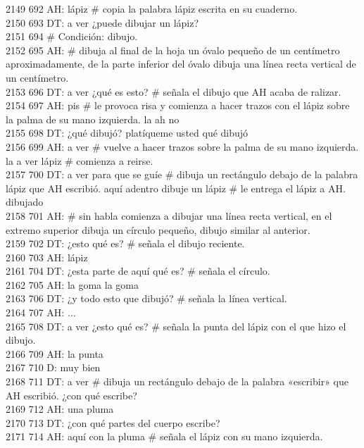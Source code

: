 2149 692 AH: lápiz # copia la palabra lápiz escrita en su cuaderno.\\
2150 693 DT: a ver ¿puede dibujar un lápiz?\\
2151 694 # Condición: dibujo.\\
2152 695 AH: # dibuja al final de la hoja un óvalo pequeño de un centímetro aproximadamente, de la parte inferior del óvalo dibuja una línea recta vertical de un centímetro.\\
2153 696 DT: a ver ¿qué es esto? # señala el dibujo que AH acaba de ralizar.\\
2154 697 AH: pis # le provoca risa y comienza a hacer trazos con el lápiz sobre la palma de su mano izquierda. la ah no\\
2155 698 DT: ¿qué dibujó? platíqueme usted qué dibujó\\
2156 699 AH: a ver # vuelve a hacer trazos sobre la palma de su mano izquierda. la a ver lápiz # comienza a reirse. \\
2157 700 DT: a ver para que se guíe # dibuja un rectángulo debajo de la palabra lápiz que AH escribió. aquí adentro dibuje un lápiz # le entrega el lápiz a AH. dibujado\\
2158 701 AH: # sin habla comienza a dibujar una línea recta vertical, en el extremo superior dibuja un círculo pequeño, dibujo similar al anterior.\\
2159 702 DT: ¿esto qué es? # señala el dibujo reciente.\\
2160 703 AH: lápiz\\
2161 704 DT: ¿esta parte de aquí qué es? # señala el círculo.\\
2162 705 AH: la goma la goma\\
2163 706 DT: ¿y todo esto que dibujó? # señala la línea vertical.\\
2164 707 AH: ...\\
2165 708 DT: a ver ¿esto qué es? # señala la punta del lápiz con el que hizo el dibujo.\\
2166 709 AH: la punta\\
2167 710 D: muy bien\\
2168 711 DT: a ver # dibuja un rectángulo debajo de la palabra «escribir» que AH escribió. ¿con qué escribe?\\
2169 712 AH: una pluma\\
2170 713 DT: ¿con qué partes del cuerpo escribe?\\
2171 714 AH: aquí con la pluma # señala el lápiz con su mano izquierda.\\
